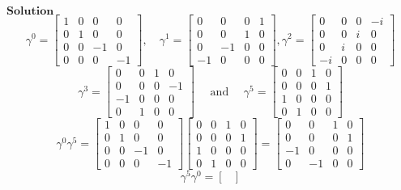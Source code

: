 \documentclass{article}
\begin{document}
\begin{flushleft}
$\boxed{\textbf{Solution}}$ 
$$
\gamma^{0}=\begin{bmatrix}
1 & 0 & 0 & 0 \\
0 & 1 & 0 & 0 \\
0 & 0 & -1 & 0 \\
0 & 0 & 0 & -1
\end{bmatrix}, \quad \gamma^{1}=\begin{bmatrix}
0 & 0 & 0 & 1 \\
0 & 0 & 1 & 0 \\
0 & -1 & 0 & 0 \\
-1 & 0 & 0 & 0
\end{bmatrix}, \gamma^{2}=\begin{bmatrix}
0 & 0 & 0 & -i \\
0 & 0 & i & 0 \\
0 & i & 0 & 0 \\
-i & 0 & 0 & 0
\end{bmatrix}
$$
$$
\gamma^{3}=\begin{bmatrix}
0 & 0 & 1 & 0 \\
0 & 0 & 0 & -1 \\
-1 & 0 & 0 & 0 \\
0 & 1 & 0 & 0
\end{bmatrix}\quad \text { and }\quad \gamma^{5}=\begin{bmatrix}
0 & 0 & 1 & 0 \\
0 & 0 & 0 & 1 \\
1 & 0 & 0 & 0 \\
0 & 1 & 0 & 0
\end{bmatrix}
$$
$$
\gamma^{0} \gamma^{5}=\begin{bmatrix}
1 & 0 & 0 & 0 \\
0 & 1 & 0 & 0 \\
0 & 0 & -1 & 0 \\
0 & 0 & 0 & -1
\end{bmatrix}\begin{bmatrix}
0 & 0 & 1 & 0 \\
0 & 0 & 0 & 1 \\
1 & 0 & 0 & 0 \\
0 & 1 & 0 & 0
\end{bmatrix}=\begin{bmatrix}
0 & 0 & 1 & 0 \\
0 & 0 & 0 & 1 \\
-1 & 0 & 0 & 0 \\
0 & -1 & 0 & 0
\end{bmatrix}
$$
$$
\gamma^{5} \gamma^{0}=\begin{bmatrix}

\end{bmatrix}$$
\end{flushleft}
\end{document}
